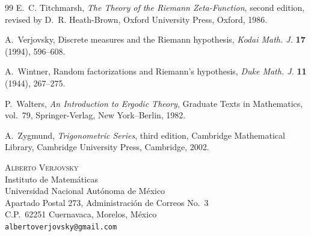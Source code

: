 \documentclass[11pt]{article}
\theoremstyle{remark}
\begin{document}
\begin{thebibliography}{99}
E.~C. Titchmarsh,
\newblock \emph{The Theory of the Riemann Zeta-Function},
\newblock second edition, revised by D.~R. Heath-Brown,
Oxford University Press, Oxford, 1986.

A.~Verjovsky,
Discrete measures and the Riemann hypothesis,
\emph{Kodai Math. J.} \textbf{17} (1994), 596--608.

A.~Wintner,
Random factorizations and Riemann's hypothesis,
\emph{Duke Math. J.} \textbf{11} (1944), 267--275.

P.~Walters,
\newblock \emph{An Introduction to Ergodic Theory},
\newblock Graduate Texts in Mathematics, vol.~79,
Springer-Verlag, New York--Berlin, 1982.

A.~Zygmund,
\newblock \emph{Trigonometric Series},
\newblock third edition, Cambridge Mathematical Library,
Cambridge University Press, Cambridge, 2002.

\end{thebibliography}

\bigskip
\noindent
\textsc{Alberto Verjovsky}\\
Instituto de Matem\'aticas\\
Universidad Nacional Aut\'onoma de M\'exico\\
Apartado Postal 273, Administraci\'on de Correos No.~3\\
C.P.~62251 Cuernavaca, Morelos, M\'exico\\
\texttt{albertoverjovsky@gmail.com}
\end{document}
